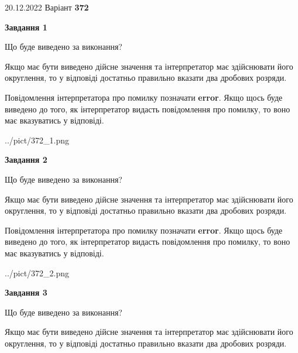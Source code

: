 \documentclass[12pt, ukrainian]{article}
\begin{document}
{20.12.2022 Варіант \No \textbf { 372 }\par}
{
\begin {Large}

{\begin {center}\textbf{Завдання 1}\end {center}}\par
Що буде виведено за виконання? \par

Якщо має бути виведено дійсне значення та інтерпретатор має здійснювати його округлення, 
то у відповіді достатньо правильно вказати два дробових розряди.

Повідомлення інтерпретатора про помилку позначати \textbf{error}.
Якщо щось буде виведено до того, як інтерпретатор видасть повідомлення про помилку, 
то воно має вказуватись у відповіді. \par

\begin{center}
	{../pict/372_1.png}
\end{center}
\newpage

{\begin {center}\textbf{Завдання 2}\end {center}}\par
Що буде виведено за виконання? \par

Якщо має бути виведено дійсне значення та інтерпретатор має здійснювати його округлення, 
то у відповіді достатньо правильно вказати два дробових розряди.

Повідомлення інтерпретатора про помилку позначати \textbf{error}.
Якщо щось буде виведено до того, як інтерпретатор видасть повідомлення про помилку, 
то воно має вказуватись у відповіді. \par

\begin{center}
	{../pict/372_2.png}
\end{center}
\newpage

{\begin {center}\textbf{Завдання 3}\end {center}}\par
Що буде виведено за виконання? \par

Якщо має бути виведено дійсне значення та інтерпретатор має здійснювати його округлення, 
то у відповіді достатньо правильно вказати два дробових розряди.


\end{Large}}
\end{document}
